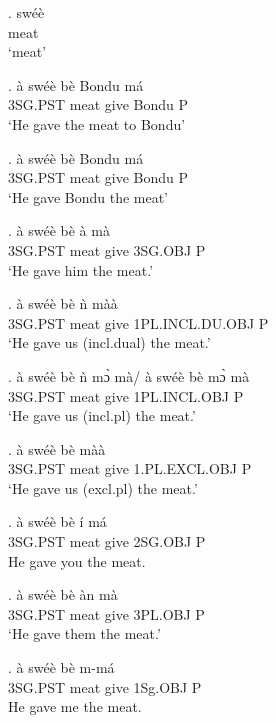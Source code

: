 \documentclass{assets/fieldnotes}
\begin{document}
\exg. swéè\\
meat\\
`meat'


\exg. à swéè bè Bondu má\\
3SG.PST meat give Bondu P\\
`He gave the meat to Bondu' 

\exg.  à swéè bè Bondu má\\
3SG.PST meat give Bondu P\\
`He gave Bondu the meat'

\exg. à swéè bè à mà\\
3SG.PST meat give 3SG.OBJ P\\
`He gave him the meat.'

\exg. à swéè bè ǹ màà\\
3SG.PST meat give 1PL.INCL.DU.OBJ P\\
`He gave us (incl.dual) the meat.'

\exg. à swéè bè ǹ mɔ̀ mà/ à swéè bè mɔ̀ mà\\
3SG.PST meat give 1PL.INCL.OBJ P\\
`He gave us (incl.pl) the meat.'



\exg. à swéè bè màà\\
3SG.PST meat give 1.PL.EXCL.OBJ P\\
`He gave us (excl.pl) the meat.'


\exg. à swéè bè í má\\
3SG.PST meat give 2SG.OBJ P\\
He gave you the meat.

\exg. à swéè bè àn mà\\
3SG.PST meat give 3PL.OBJ P\\
`He gave them the meat.'



\exg. à swéè bè m-má \\
3SG.PST meat give 1Sg.OBJ P\\
He gave me the meat. 
\end{document}

